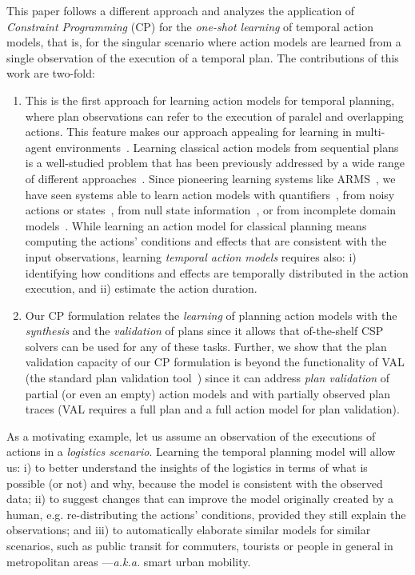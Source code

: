 \documentclass{ecai}
\begin{document}
This paper follows a different approach and analyzes the application of {\em Constraint Programming} (CP) for the {\em one-shot learning} of temporal action models, that is, for the singular scenario where action models are learned from a single observation of the execution of a temporal plan. The contributions of this work are two-fold:
\begin{enumerate}  
\item This is the first approach for learning action models for temporal planning, where plan observations can refer to the execution of paralel and overlapping actions. This feature makes our approach appealing for learning in multi-agent environments~\cite{furelos2018carpool}. Learning classical action models from sequential plans is a well-studied problem that has been previously addressed by a wide range of different approaches~\cite{arora2018review}. Since pioneering learning systems like ARMS~\cite{yang2007learning}, we have seen systems able to learn action models with quantifiers~\cite{AmirC08,ZhuoYHL10}, from noisy actions or states~\cite{MouraoZPS12,zhuo2013action}, from null state information~\cite{cresswell2013}, or from incomplete domain models~\cite{ZhuoK17,ZhuoNK13}. While learning an action model for classical planning means computing the actions' conditions and effects that are consistent with the input observations, learning {\em temporal action models} requires also: i) identifying how conditions and effects are temporally distributed in the action execution, and ii) estimate the action duration. 
\item Our CP formulation relates the {\em learning} of planning action models with the {\em synthesis} and the {\em validation} of plans since it allows that of-the-shelf CSP solvers can be used for any of these tasks. Further, we show that the plan validation capacity of our CP formulation is beyond the functionality of VAL (the standard plan validation tool~\cite{howey2004val}) since it can address {\em plan validation} of partial (or even an empty) action models and with partially observed plan traces (VAL requires a full plan and a full action model for plan validation). 
\end{enumerate}

As a motivating example, let us assume an observation of the executions of actions in a {\em logistics scenario}. Learning the temporal planning model will allow us: i) to better understand the insights of the logistics in terms of what is possible (or not) and why, because the model is consistent with the observed data; ii) to suggest changes that can improve the model originally created by a human, e.g. re-distributing the actions' conditions, provided they still explain the observations; and iii) to automatically elaborate similar models for similar scenarios, such as public transit for commuters, tourists or people in general in metropolitan areas ---\emph{a.k.a.} smart urban mobility.
\end{document}
